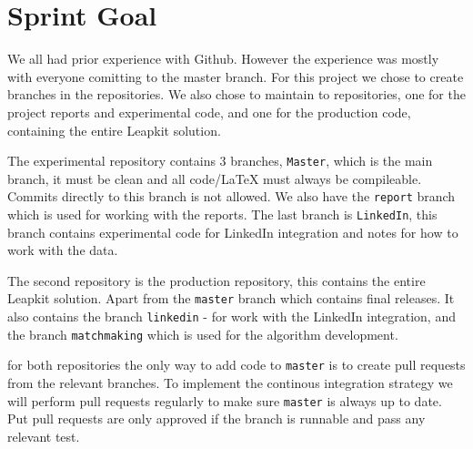 \section{Sprint Goal}

We all had prior experience with Github. However the experience was mostly with everyone comitting to the master branch. For this project we chose to create branches in the repositories. We also chose to maintain to repositories, one for the project reports and experimental code, and one for the production code, containing the entire Leapkit solution.

The experimental repository contains 3 branches, \texttt{Master}, which is the main branch, it must be clean and all code/LaTeX must always be compileable. Commits directly to this branch is not allowed. We also have the \texttt{report} branch which is used for working with the reports. The last branch is \texttt{LinkedIn}, this branch contains experimental code for LinkedIn integration and notes for how to work with the data.

The second repository is the production repository, this contains the entire Leapkit solution. Apart from the \texttt{master} branch which contains final releases. It also contains the branch \texttt{linkedin} - for work with the LinkedIn integration, and the branch \texttt{matchmaking} which is used for the algorithm development.

for both repositories the only way to add code to \texttt{master} is to create pull requests from the relevant branches. To implement the continous integration strategy we will perform pull requests regularly to make sure \texttt{master} is always up to date. Put pull requests are only approved if the branch is runnable and pass any relevant test.

